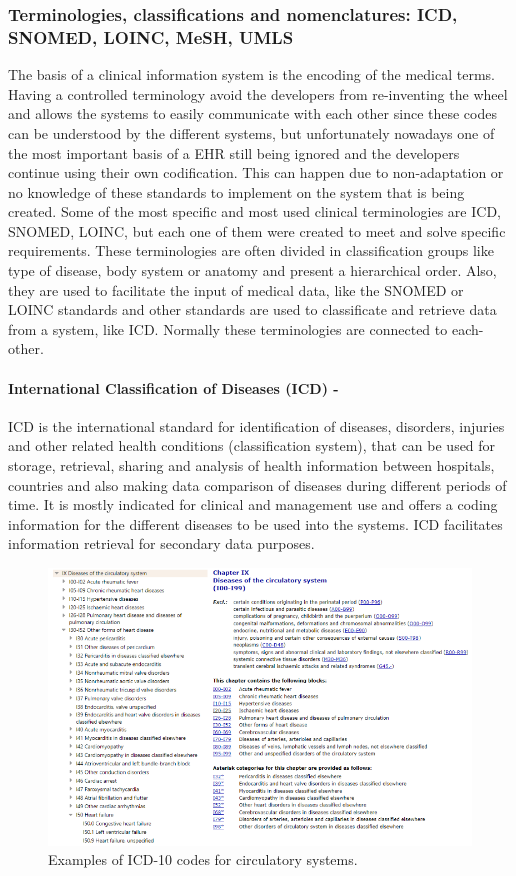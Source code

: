 \documentclass[mim_thesis.tex]{subfiles}
\begin{document}
\subsubsection{Terminologies, classifications and nomenclatures: ICD, SNOMED, LOINC, MeSH, UMLS }
The basis of a clinical information system is the encoding of the medical terms. Having a controlled terminology avoid the developers from re-inventing the wheel and allows the systems to easily communicate with each other since these codes can be understood by the different systems, but unfortunately nowadays one of the most important basis of a EHR still being ignored and the developers continue using their own codification. This can happen due to non-adaptation or no knowledge of these standards to implement on the system that is being created. Some of the most specific and most used clinical terminologies are ICD, SNOMED, LOINC, but each one of them were created to meet and solve specific requirements. These terminologies are often divided in classification groups like type of disease, body system or anatomy and present a hierarchical order. Also, they are used to facilitate the input of medical data, like the SNOMED or LOINC standards and other standards are used to classificate and retrieve data from a system, like ICD. Normally these terminologies are connected to each-other. \citep{Bowman2005CoordinationOS}

\paragraph{\textbf{International Classification of Diseases (ICD) -}}
ICD is the international standard for identification of diseases, disorders, injuries and other related health conditions (classification system), that can be used for storage, retrieval, sharing and analysis of health information between hospitals, countries and also making data comparison of diseases during different periods of time. It is mostly indicated for clinical and management use and offers a coding information for the different diseases to be used into the systems. ICD facilitates information retrieval for secondary data purposes.

\begin{figure}[H]
	\centering
    \includegraphics[width=1.1\textwidth]{img/icd.PNG}
	\caption{Examples of ICD-10 codes for circulatory systems.}
	\label{fig:icd_10}
\end{figure}
\end{document}
